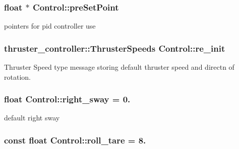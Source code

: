 \subsubsection[{\texorpdfstring{pre\+Set\+Point}{preSetPoint}}]{\setlength{\rightskip}{0pt plus 5cm}float $\ast$ Control\+::pre\+Set\+Point\hspace{0.3cm}{\ttfamily [private]}}\hypertarget{classControl_a94f3484d88729c31dfd74b983f7fab0d}{}\label{classControl_a94f3484d88729c31dfd74b983f7fab0d}


pointers for pid controller use 

\subsubsection[{\texorpdfstring{re\+\_\+init}{re_init}}]{\setlength{\rightskip}{0pt plus 5cm}thruster\+\_\+controller\+::\+Thruster\+Speeds Control\+::re\+\_\+init\hspace{0.3cm}{\ttfamily [private]}}\hypertarget{classControl_a575ab1b3c33d659078391792285040d9}{}\label{classControl_a575ab1b3c33d659078391792285040d9}


Thruster Speed type message storing default thruster speed and directn of rotation. 

\subsubsection[{\texorpdfstring{right\+\_\+sway}{right_sway}}]{\setlength{\rightskip}{0pt plus 5cm}float Control\+::right\+\_\+sway = 0.\hspace{0.3cm}{\ttfamily [private]}}\hypertarget{classControl_a944fd0cb50f0ba016a91fac4d6211a4b}{}\label{classControl_a944fd0cb50f0ba016a91fac4d6211a4b}


default right sway 

\subsubsection[{\texorpdfstring{roll\+\_\+tare}{roll_tare}}]{\setlength{\rightskip}{0pt plus 5cm}const float Control\+::roll\+\_\+tare = 8.\hspace{0.3cm}{\ttfamily [private]}}\hypertarget{classControl_ae5285f73379bd5cbc060d99983de2c82}{}\label{classControl_ae5285f73379bd5cbc060d99983de2c82}
